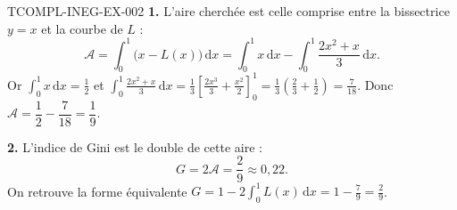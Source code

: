 \begin{corrige}{TCOMPL-INEG-EX-002}
\textbf{1.} L'aire cherchée est celle comprise entre la bissectrice $y=x$ et
la courbe de $L$ :
\[
  \mathcal{A} = \int_0^1\big(x - L(x)\big)\,\mathrm{d}x
  = \int_0^1 x\,\mathrm{d}x - \int_0^1 \frac{2x^2+x}{3}\,\mathrm{d}x .
\]
Or $\displaystyle\int_0^1 x\,\mathrm{d}x = \frac{1}{2}$ et
$\displaystyle\int_0^1 \frac{2x^2+x}{3}\,\mathrm{d}x
= \frac{1}{3}\left[\frac{2x^3}{3}+\frac{x^2}{2}\right]_0^1
= \frac{1}{3}\left(\frac{2}{3}+\frac{1}{2}\right) = \frac{7}{18}$.
Donc $\mathcal{A} = \dfrac{1}{2}-\dfrac{7}{18} = \dfrac{1}{9}$.

\textbf{2.} L'indice de Gini est le double de cette aire :
\[
  G = 2\mathcal{A} = \frac{2}{9} \approx 0{,}22.
\]
On retrouve la forme équivalente
$G = 1 - 2\displaystyle\int_0^1 L(x)\,\mathrm{d}x = 1 - \frac{7}{9} = \frac{2}{9}$.
\end{corrige}
